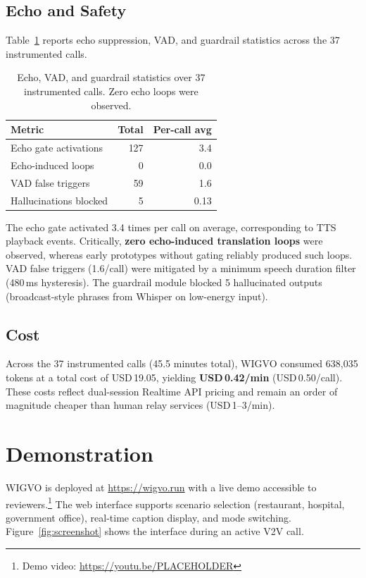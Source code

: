 \documentclass[11pt]{article}
\begin{document}
\subsection{Echo and Safety}

Table~\ref{tab:safety} reports echo suppression, VAD, and guardrail statistics across the 37 instrumented calls.

\begin{table}[t]
  \centering
  \small
  \begin{tabular}{lrr}
    \toprule
    \textbf{Metric} & \textbf{Total} & \textbf{Per-call avg} \\
    \midrule
    Echo gate activations & 127 & 3.4 \\
    Echo-induced loops & 0 & 0.0 \\
    VAD false triggers & 59 & 1.6 \\
    Hallucinations blocked & 5 & 0.13 \\
    \bottomrule
  \end{tabular}
  \caption{Echo, VAD, and guardrail statistics over 37 instrumented calls. Zero echo loops were observed.}
  \label{tab:safety}
\end{table}

The echo gate activated 3.4 times per call on average, corresponding to TTS playback events. Critically, \textbf{zero echo-induced translation loops} were observed, whereas early prototypes without gating reliably produced such loops. VAD false triggers (1.6/call) were mitigated by a minimum speech duration filter (480\,ms hysteresis). The guardrail module blocked 5 hallucinated outputs (broadcast-style phrases from Whisper on low-energy input).


\subsection{Cost}

Across the 37 instrumented calls (45.5 minutes total), WIGVO consumed 638{,}035 tokens at a total cost of USD\,19.05, yielding \textbf{USD\,0.42/min} (USD\,0.50/call). These costs reflect dual-session Realtime API pricing and remain an order of magnitude cheaper than human relay services (USD\,1--3/min).

\section{Demonstration}

WIGVO is deployed at \url{https://wigvo.run} with a live demo accessible to reviewers.\footnote{Demo video: \url{https://youtu.be/PLACEHOLDER}} The web interface supports scenario selection (restaurant, hospital, government office), real-time caption display, and mode switching. Figure~\ref{fig:screenshot} shows the interface during an active V2V call.
\end{document}
